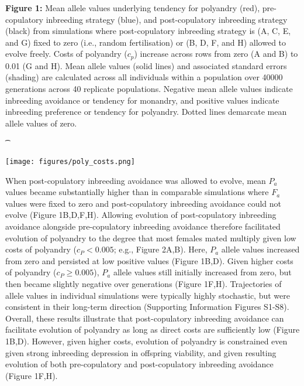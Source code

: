 \documentclass[10pt,letterpaper]{article}
\begin{document}
\vspace{2 mm}
{\color{Gray}
    \begin{adjustwidth}{-2.2in}{0in}
{ 
        \begin{justify}
        \vspace{-14.25 mm}
        {\bf Figure 1:} Mean allele values underlying tendency for polyandry (red), pre-copulatory inbreeding strategy (blue), and post-copulatory inbreeding strategy (black) from simulations where post-copulatory inbreeding strategy is (A, C, E, and G) fixed to zero (i.e., random fertilisation) or (B, D, F, and H) allowed to evolve freely. Costs of polyandry ($c_p$) increase across rows from zero (A and B) to 0.01 (G and H). Mean allele values (solid lines) and associated standard errors (shading) are calculated across all individuals within a population over 40000 generations across 40 replicate populations. Negative mean allele values indicate inbreeding avoidance or tendency for monandry, and positive values indicate inbreeding preference or tendency for polyandry. Dotted lines demarcate mean allele values of zero.
    \end{justify}{\t}
}
{
   \texttt{[image: figures/poly\_costs.png]}%
}
    \end{adjustwidth}
}
\vspace{2 mm}

When post-copulatory inbreeding avoidance was allowed to evolve, mean $P_{a}$ values became substantially higher than in comparable simulations where $F_{a}$ values were fixed to zero and post-copulatory inbreeding avoidance could not evolve (Figure 1B,D,F,H). Allowing evolution of post-copulatory inbreeding avoidance alongside pre-copulatory inbreeding avoidance therefore facilitated evolution of polyandry to the degree that most females mated multiply given low costs of polyandry ($c_{P} < 0.005$; e.g., Figure 2A,B). Here, $P_{a}$ allele values increased from zero and persisted at low positive values (Figure 1B,D). Given higher costs of polyandry ($c_{P} \geq 0.005$), $P_{a}$ allele values still initially increased from zero, but then became slightly negative over generations (Figure 1F,H). Trajectories of allele values in individual simulations were typically highly stochastic, but were consistent in their long-term direction (Supporting Information Figures S1-S8). Overall, these results illustrate that post-copulatory inbreeding avoidance can facilitate evolution of polyandry as long as direct costs are sufficiently low (Figure 1B,D). However, given higher costs, evolution of polyandry is constrained even given strong inbreeding depression in offspring viability, and given resulting evolution of both pre-copulatory and post-copulatory inbreeding avoidance (Figure 1F,H).
\end{document}
